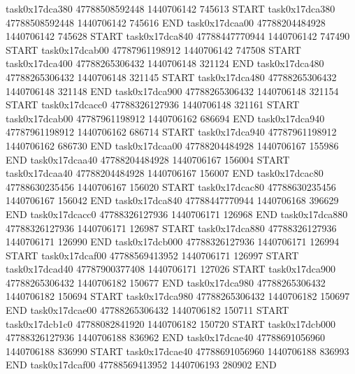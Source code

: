 task0x17dca380 47788508592448          1440706142               745613  START
task0x17dca380 47788508592448          1440706142               745616  END
task0x17dcaa00 47788204484928          1440706142               745628  START
task0x17dca840 47788447770944          1440706142               747490  START
task0x17dcab00 47787961198912          1440706142               747508  START
task0x17dca400 47788265306432          1440706148               321124  END
task0x17dca480 47788265306432          1440706148               321145  START
task0x17dca480 47788265306432          1440706148               321148  END
task0x17dca900 47788265306432          1440706148               321154  START
task0x17dcacc0 47788326127936          1440706148               321161  START
task0x17dcab00 47787961198912          1440706162               686694  END
task0x17dca940 47787961198912          1440706162               686714  START
task0x17dca940 47787961198912          1440706162               686730  END
task0x17dcaa00 47788204484928          1440706167               155986  END
task0x17dcaa40 47788204484928          1440706167               156004  START
task0x17dcaa40 47788204484928          1440706167               156007  END
task0x17dcac80 47788630235456          1440706167               156020  START
task0x17dcac80 47788630235456          1440706167               156042  END
task0x17dca840 47788447770944          1440706168               396629  END
task0x17dcacc0 47788326127936          1440706171               126968  END
task0x17dca880 47788326127936          1440706171               126987  START
task0x17dca880 47788326127936          1440706171               126990  END
task0x17dcb000 47788326127936          1440706171               126994  START
task0x17dcaf00 47788569413952          1440706171               126997  START
task0x17dcad40 47787900377408          1440706171               127026  START
task0x17dca900 47788265306432          1440706182               150677  END
task0x17dca980 47788265306432          1440706182               150694  START
task0x17dca980 47788265306432          1440706182               150697  END
task0x17dcae00 47788265306432          1440706182               150711  START
task0x17dcb1c0 47788082841920          1440706182               150720  START
task0x17dcb000 47788326127936          1440706188               836962  END
task0x17dcae40 47788691056960          1440706188               836990  START
task0x17dcae40 47788691056960          1440706188               836993  END
task0x17dcaf00 47788569413952          1440706193               280902  END
